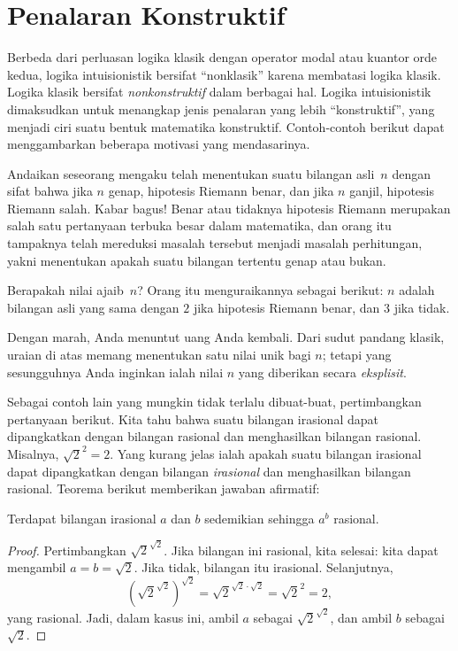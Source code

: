 \documentclass[../../../include/open-logic-chapter]{subfiles}
\begin{document}

\section{Penalaran Konstruktif}

Berbeda dari perluasan logika klasik dengan operator modal atau kuantor
orde kedua, logika intuisionistik bersifat ``nonklasik'' karena membatasi
logika klasik. Logika klasik bersifat \emph{nonkonstruktif} dalam berbagai
hal. Logika intuisionistik dimaksudkan untuk menangkap jenis penalaran yang
lebih ``konstruktif'', yang menjadi ciri suatu bentuk matematika konstruktif.
Contoh-contoh berikut dapat menggambarkan beberapa motivasi yang mendasarinya.

Andaikan seseorang mengaku telah menentukan suatu bilangan asli~$n$ dengan
sifat bahwa jika $n$ genap, hipotesis Riemann benar, dan jika $n$ ganjil,
hipotesis Riemann salah. Kabar bagus!{} Benar atau tidaknya hipotesis Riemann
merupakan salah satu pertanyaan terbuka besar dalam matematika, dan orang itu
tampaknya telah mereduksi masalah tersebut menjadi masalah perhitungan, yakni
menentukan apakah suatu bilangan tertentu genap atau bukan.

Berapakah nilai ajaib~$n$? Orang itu menguraikannya sebagai berikut: $n$
adalah bilangan asli yang sama dengan $2$ jika hipotesis Riemann benar, dan
$3$ jika tidak.

Dengan marah, Anda menuntut uang Anda kembali. Dari sudut pandang klasik,
uraian di atas memang menentukan satu nilai unik bagi $n$; tetapi yang
sesungguhnya Anda inginkan ialah nilai $n$ yang diberikan secara
\emph{eksplisit}.

Sebagai contoh lain yang mungkin tidak terlalu dibuat-buat, pertimbangkan
pertanyaan berikut. Kita tahu bahwa suatu bilangan irasional dapat dipangkatkan
dengan bilangan rasional dan menghasilkan bilangan rasional. Misalnya,
$\sqrt{2}^2 = 2$. Yang kurang jelas ialah apakah suatu bilangan irasional dapat
dipangkatkan dengan bilangan \emph{irasional} dan menghasilkan bilangan
rasional. Teorema berikut memberikan jawaban afirmatif:

\begin{thm}
Terdapat bilangan irasional $a$ dan $b$ sedemikian sehingga $a^b$ rasional.
\end{thm}

\begin{proof}
Pertimbangkan $\sqrt{2}^{\sqrt{2}}$. Jika bilangan ini rasional, kita selesai:
kita dapat mengambil $a = b = \sqrt{2}$. Jika tidak, bilangan itu irasional.
Selanjutnya,
\[
(\sqrt{2}^{\sqrt{2}})^{\sqrt{2}} = \sqrt{2}^{\sqrt{2} \cdot
  \sqrt{2}} = \sqrt{2}^2 = 2,
\]
yang rasional. Jadi, dalam kasus ini, ambil $a$ sebagai
$\sqrt{2}^{\sqrt{2}}$, dan ambil $b$ sebagai~$\sqrt 2$.
\end{proof}
\end{document}
